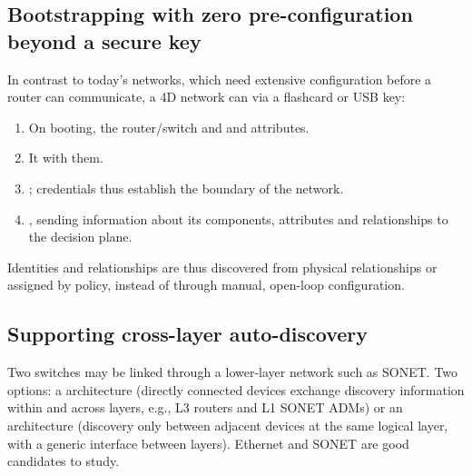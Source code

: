 \subsection{Bootstrapping with zero pre-configuration beyond a secure key}
In contrast to today's networks, which need extensive configuration before a router can communicate, a 4D network can  via a flashcard or USB key:
\begin{enumerate}
\item On booting, the router/switch  and  and attributes.
\item It  with them.
\item {}; credentials thus establish the boundary of the network.
\item {}, sending information about its components, attributes and relationships to the decision plane.
\end{enumerate}
Identities and relationships are thus discovered from physical relationships or assigned by policy, instead of through manual, open-loop configuration.

\subsection{Supporting cross-layer auto-discovery}
Two switches may be linked through a lower-layer network such as SONET. Two options: a  architecture (directly connected devices exchange discovery information within and across layers, e.g., L3 routers and L1 SONET ADMs) or an  architecture (discovery only between adjacent devices at the same logical layer, with a generic interface between layers). Ethernet and SONET are good candidates to study.

